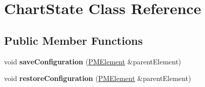 \hypertarget{classChartState}{
\section{ChartState Class Reference}
\label{classChartState}
}
\subsection*{Public Member Functions}
\begin{DoxyCompactItemize}
\item 
\hypertarget{classChartState_aa12466d2d0789c436ba48bc424be7b42}{
void {\bfseries saveConfiguration} (\hyperlink{classPMElement}{PMElement} \&parentElement)}
\label{classChartState_aa12466d2d0789c436ba48bc424be7b42}

\item 
\hypertarget{classChartState_a0dfce3561821f1df38f21d53c5579327}{
void {\bfseries restoreConfiguration} (\hyperlink{classPMElement}{PMElement} \&parentElement)}
\label{classChartState_a0dfce3561821f1df38f21d53c5579327}

\end{DoxyCompactItemize}
